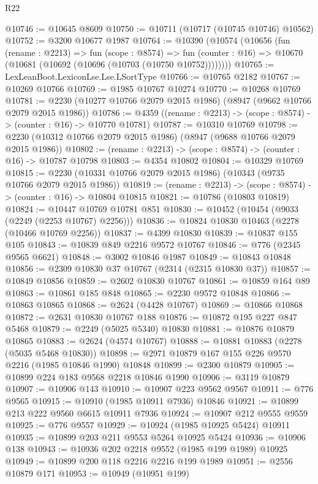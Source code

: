 \begin{lexlean}{R22}
\begin{coremodule}
@10746 := @10645 @8609
@10750 := @10711 (@10717 (@10745 @10746) @10562)
@10752 := @3200 @10677 @1987
@10764 := @10390
    (@10574
      (@10656
        (fun (rename : @2213) =>
        fun (scope : @8574) =>
        fun (counter : @16) => @10670 (@10681 (@10692 (@10696 (@10703 (@10750 @10752))))))))
@10765 := LexLeanBoot.LexiconLse.Lse.LSortType
@10766 := @10765 @2182
@10767 := @10269 @10766
@10769 := @1985 @10767 @10274
@10770 := @10268 @10769
@10781 := @2230 (@10277 @10766 @2079 @2015 @1986) (@8947 (@9662 @10766 @2079 @2015 @1986))
@10786 := @4359 ((rename : @2213) -> (scope : @8574) -> (counter : @16) -> @10770 @10781)
@10787 := @10310 @10769
@10798 := @2230 (@10312 @10766 @2079 @2015 @1986) (@8947 (@9688 @10766 @2079 @2015 @1986))
@10802 := (rename : @2213) -> (scope : @8574) -> (counter : @16) -> @10787 @10798
@10803 := @4354 @10802
@10804 := @10329 @10769
@10815 := @2230 (@10331 @10766 @2079 @2015 @1986) (@10343 (@9735 @10766 @2079 @2015 @1986))
@10819 := (rename : @2213) -> (scope : @8574) -> (counter : @16) -> @10804 @10815
@10821 := @10786 (@10803 @10819)
@10824 := @10447 @10769 @10781 @851
@10830 := @10452 (@10454 (@9033 (@2249 (@2253 @10767) @2256)))
@10836 := @10824 @10830 @10463 (@2278 (@10466 @10769 @2256))
@10837 := @4399 @10830
@10839 := @10837 @155 @105
@10843 := @10839 @849 @2216 @9572 @10767
@10846 := @776 (@2345 @9565 @6621)
@10848 := @3002 @10846 @1987
@10849 := @10843 @10848
@10856 := @2309 @10830 @37 @10767 (@2314 (@2315 @10830 @37))
@10857 := @10849 @10856
@10859 := @2602 @10830 @10767
@10861 := @10859 @164 @89
@10863 := @10861 @185 @848
@10865 := @2230 @9572 @10848
@10866 := @10863 @10865
@10868 := @2624 (@4428 @10767)
@10869 := @10866 @10868
@10872 := @2631 @10830 @10767 @188
@10876 := @10872 @195 @227 @847 @5468
@10879 := @2249 (@5025 @5340) @10830
@10881 := @10876 @10879 @10865
@10883 := @2624 (@4574 @10767)
@10888 := @10881 @10883 (@2278 (@5035 @5468 @10830))
@10898 := @2971 @10879 @167 @155 @226 @9570 @2216 (@1985 @10846 @1990) @10848
@10899 := @2300 @10879
@10905 := @10899 @224 @183 @9568 @2218 @10846 @1990
@10906 := @3119 @10879
@10907 := @10906 @143
@10910 := @10907 @223 @9562 @9567
@10911 := @776 @9565
@10915 := @10910 (@1985 @10911 @7936) @10846
@10921 := @10899 @213 @222 @9560 @6615 @10911 @7936
@10924 := @10907 @212 @9555 @9559
@10925 := @776 @9557
@10929 := @10924 (@1985 @10925 @5424) @10911
@10935 := @10899 @203 @211 @9553 @5264 @10925 @5424
@10936 := @10906 @138
@10943 := @10936 @202 @2218 @9552 (@1985 @199 @1989) @10925
@10949 := @10899 @200 @118 @2216 @2216 @199 @1989
@10951 := @2556 @10879 @171
@10953 := @10949 (@10951 @199)

\end{coremodule}
\end{lexlean}
